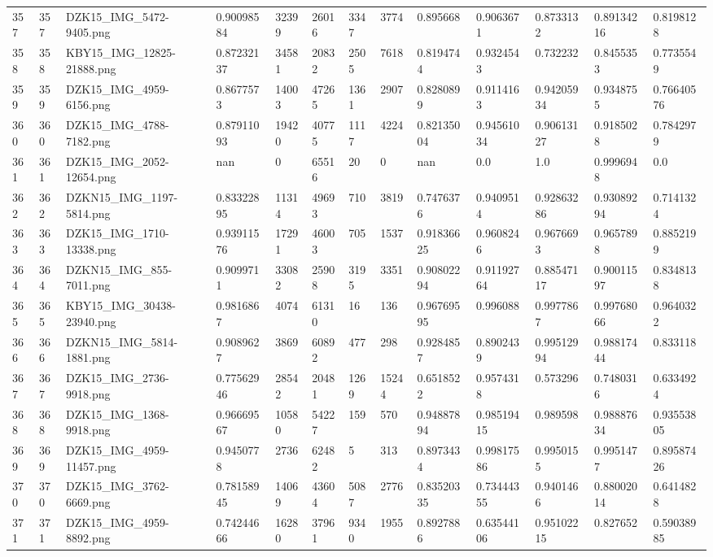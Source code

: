 \documentclass[11pt, a4paper, twoside]{report}
\begin{document}
\begin{longtable}[c]{@{}lllllllllllll@{}}
357 & 357 & DZK15\_IMG\_5472-9405.png & 0.90098584 & 32399 & 26016 & 3347 & 3774 & 0.895668 & 0.9063671 & 0.8733132 & 0.89134216 & 0.8198128 \\
358 & 358 & KBY15\_IMG\_12825-21888.png & 0.87232137 & 34581 & 20832 & 2505 & 7618 & 0.8194744 & 0.9324543 & 0.732232 & 0.8455353 & 0.7735549 \\
359 & 359 & DZK15\_IMG\_4959-6156.png & 0.8677573 & 14003 & 47265 & 1361 & 2907 & 0.8280899 & 0.9114163 & 0.94205934 & 0.9348755 & 0.76640576 \\
360 & 360 & DZK15\_IMG\_4788-7182.png & 0.87911093 & 19420 & 40775 & 1117 & 4224 & 0.82135004 & 0.94561034 & 0.90613127 & 0.9185028 & 0.7842979 \\
361 & 361 & DZK15\_IMG\_2052-12654.png & nan & 0 & 65516 & 20 & 0 & nan & 0.0 & 1.0 & 0.9996948 & 0.0 \\
362 & 362 & DZKN15\_IMG\_1197-5814.png & 0.83322895 & 11314 & 49693 & 710 & 3819 & 0.7476376 & 0.9409514 & 0.92863286 & 0.93089294 & 0.7141324 \\
363 & 363 & DZK15\_IMG\_1710-13338.png & 0.93911576 & 17291 & 46003 & 705 & 1537 & 0.91836625 & 0.9608246 & 0.9676693 & 0.9657898 & 0.8852199 \\
364 & 364 & DZKN15\_IMG\_855-7011.png & 0.9099711 & 33082 & 25908 & 3195 & 3351 & 0.90802294 & 0.91192764 & 0.88547117 & 0.90011597 & 0.8348138 \\
365 & 365 & KBY15\_IMG\_30438-23940.png & 0.9816867 & 4074 & 61310 & 16 & 136 & 0.96769595 & 0.996088 & 0.9977867 & 0.99768066 & 0.9640322 \\
366 & 366 & DZKN15\_IMG\_5814-1881.png & 0.9089627 & 3869 & 60892 & 477 & 298 & 0.9284857 & 0.8902439 & 0.99512994 & 0.98817444 & 0.833118 \\
367 & 367 & DZK15\_IMG\_2736-9918.png & 0.77562946 & 28542 & 20481 & 1269 & 15244 & 0.6518522 & 0.9574318 & 0.573296 & 0.7480316 & 0.6334924 \\
368 & 368 & DZK15\_IMG\_1368-9918.png & 0.96669567 & 10580 & 54227 & 159 & 570 & 0.94887894 & 0.98519415 & 0.989598 & 0.98887634 & 0.93553805 \\
369 & 369 & DZK15\_IMG\_4959-11457.png & 0.9450778 & 2736 & 62482 & 5 & 313 & 0.8973434 & 0.99817586 & 0.9950155 & 0.9951477 & 0.89587426 \\
370 & 370 & DZK15\_IMG\_3762-6669.png & 0.78158945 & 14069 & 43604 & 5087 & 2776 & 0.83520335 & 0.73444355 & 0.9401466 & 0.88002014 & 0.6414828 \\
371 & 371 & DZK15\_IMG\_4959-8892.png & 0.74244666 & 16280 & 37961 & 9340 & 1955 & 0.8927886 & 0.63544106 & 0.95102215 & 0.827652 & 0.59038985 \\

\end{longtable}
\end{document}

